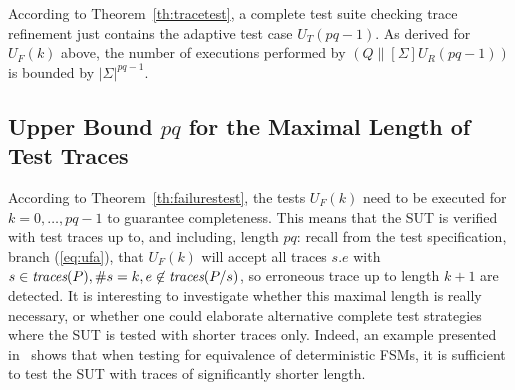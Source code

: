 According to Theorem~\ref{th:tracetest}, a complete test suite checking trace
refinement just contains the adaptive test case $U_T(pq-1)$. As derived for $U_F(k)$
above, the number of executions performed by $(Q\parallel[\Sigma] U_R(pq-1))$ 
is bounded by $|\Sigma|^{pq-1}$.


\subsection{Upper Bound $pq$ for the Maximal Length of Test Traces}

According to Theorem~\ref{th:failurestest}, the tests $U_F(k)$ need to be executed for 
$k = 0,\dots,pq-1$ to guarantee completeness. This means that the SUT is verified 
with test traces up to, and including, length $pq$:
recall from the test specification, branch (\ref{eq:ufa}), that $U_F(k)$ will accept
all traces $s.e$ with $s\in\text{\it traces}(P), \#s = k, e\not\in\text{\it traces}(P/s)$, so erroneous trace
up to length $k+1$ are detected.
It is interesting to  investigate
whether this maximal length is really necessary, or whether one could elaborate
alternative complete test strategies where the SUT is tested with shorter traces only. 
Indeed, an example  presented in~\cite[Exercise~5]{PeleskaHuangLectureNotesMBT} 
shows that when testing for equivalence of deterministic FSMs, it is sufficient to
test the SUT with traces of significantly shorter length.

